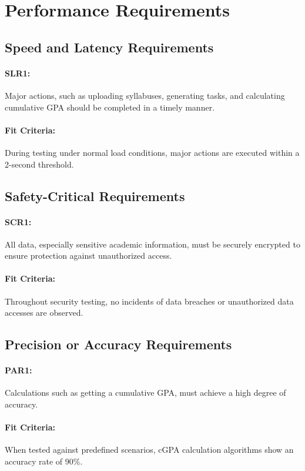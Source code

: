\documentclass[12pt]{article}
\begin{document}
\section{Performance Requirements}

\subsection{Speed and Latency Requirements}
\paragraph{SLR1:} Major actions, such as uploading syllabuses, generating tasks, and calculating cumulative GPA should be completed in a timely manner.
\paragraph{Fit Criteria:} During testing under normal load conditions, major actions are executed within a 2-second threshold.

\subsection{Safety-Critical Requirements}
\paragraph{SCR1:} All data, especially sensitive academic information, must be securely encrypted to ensure protection against unauthorized access.
\paragraph{Fit Criteria:} Throughout security testing, no incidents of data breaches or unauthorized data accesses are observed.

\subsection{Precision or Accuracy Requirements}
\paragraph{PAR1:} Calculations such as getting a cumulative GPA, must achieve a high degree of accuracy.
\paragraph{Fit Criteria:} When tested against predefined scenarios, cGPA calculation algorithms show an accuracy rate of 90\%.
\end{document}
